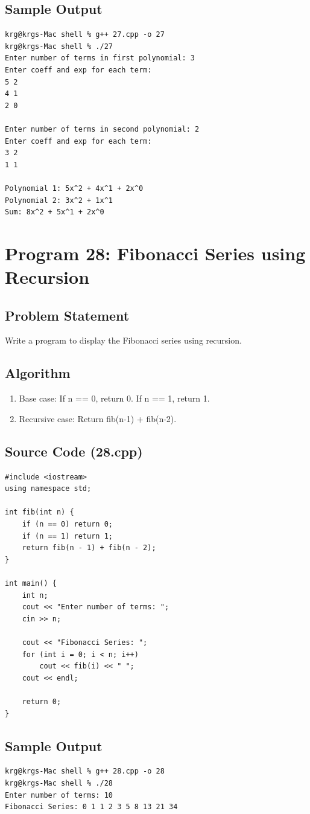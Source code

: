 \documentclass[a4paper,12pt]{article}
\begin{document}
\subsection*{Sample Output}
\begin{lstlisting}[style=outputstyle]
krg@krgs-Mac shell % g++ 27.cpp -o 27
krg@krgs-Mac shell % ./27
Enter number of terms in first polynomial: 3
Enter coeff and exp for each term:
5 2
4 1
2 0

Enter number of terms in second polynomial: 2
Enter coeff and exp for each term:
3 2
1 1

Polynomial 1: 5x^2 + 4x^1 + 2x^0
Polynomial 2: 3x^2 + 1x^1
Sum: 8x^2 + 5x^1 + 2x^0
\end{lstlisting}

\newpage

\section*{Program 28: Fibonacci Series using Recursion}

\subsection*{Problem Statement}
Write a program to display the Fibonacci series using recursion.

\subsection*{Algorithm}
\begin{enumerate}
    \item Base case: If n == 0, return 0. If n == 1, return 1.
    \item Recursive case: Return fib(n-1) + fib(n-2).
\end{enumerate}

\subsection*{Source Code (28.cpp)}
\begin{lstlisting}[style=cppstyle]
#include <iostream>
using namespace std;

int fib(int n) {
    if (n == 0) return 0;
    if (n == 1) return 1;
    return fib(n - 1) + fib(n - 2);
}

int main() {
    int n;
    cout << "Enter number of terms: ";
    cin >> n;

    cout << "Fibonacci Series: ";
    for (int i = 0; i < n; i++)
        cout << fib(i) << " ";
    cout << endl;

    return 0;
}
\end{lstlisting}

\subsection*{Sample Output}
\begin{lstlisting}[style=outputstyle]
krg@krgs-Mac shell % g++ 28.cpp -o 28
krg@krgs-Mac shell % ./28
Enter number of terms: 10
Fibonacci Series: 0 1 1 2 3 5 8 13 21 34 
\end{lstlisting}
\end{document}
